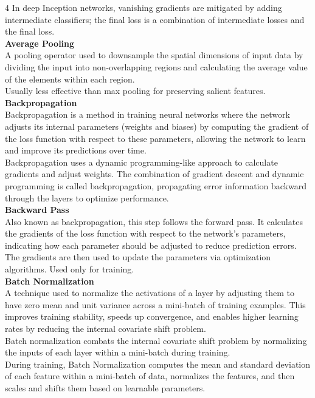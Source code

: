 \documentclass[8pt]{extarticle}
\begin{document}
\begin{multicols}{4}
In deep Inception networks, vanishing gradients are mitigated by adding intermediate classifiers; the final loss is a combination of intermediate losses and the final loss.\\
\vspace{2pt}\textbf{Average Pooling}\\
A pooling operator used to downsample the spatial dimensions of input data by dividing the input into non-overlapping regions and calculating the average value of the elements within each region.\\
Usually less effective than max pooling for preserving salient features.\\
\vspace{2pt}\textbf{Backpropagation}\\
Backpropagation is a method in training neural networks where the network adjusts its internal parameters (weights and biases) by computing the gradient of the loss function with respect to these parameters, allowing the network to learn and improve its predictions over time.\\
Backpropagation uses a dynamic programming-like approach to calculate gradients and adjust weights. The combination of gradient descent and dynamic programming is called backpropagation, propagating error information backward through the layers to optimize performance.\\
\vspace{2pt}\textbf{Backward Pass}\\
Also known as backpropagation, this step follows the forward pass. It calculates the gradients of the loss function with respect to the network's parameters, indicating how each parameter should be adjusted to reduce prediction errors. The gradients are then used to update the parameters via optimization algorithms. Used only for training.\\
\vspace{2pt}\textbf{Batch Normalization}\\
A technique used to normalize the activations of a layer by adjusting them to have zero mean and unit variance across a mini-batch of training examples. This improves training stability, speeds up convergence, and enables higher learning rates by reducing the internal covariate shift problem.\\
Batch normalization combats the internal covariate shift problem by normalizing the inputs of each layer within a mini-batch during training.\\
During training, Batch Normalization computes the mean and standard deviation of each feature within a mini-batch of data, normalizes the features, and then scales and shifts them based on learnable parameters.\\

\end{multicols}
\end{document}

